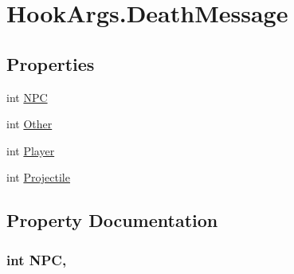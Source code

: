 \hypertarget{structOTA_1_1Plugin_1_1HookArgs_1_1DeathMessage}{}\section{Hook\+Args.\+Death\+Message}
\label{structOTA_1_1Plugin_1_1HookArgs_1_1DeathMessage}
\subsection*{Properties}
\begin{DoxyCompactItemize}
\item 
int \hyperlink{structOTA_1_1Plugin_1_1HookArgs_1_1DeathMessage_aea2a2e9f598c38e622661bbf874275cd}{N\+P\+C}
\item 
int \hyperlink{structOTA_1_1Plugin_1_1HookArgs_1_1DeathMessage_ab86a6d759692d3823e3d50399f4f9eaf}{Other}
\item 
int \hyperlink{structOTA_1_1Plugin_1_1HookArgs_1_1DeathMessage_ad8ab65f2594ec4b0f1682de80995c9a1}{Player}
\item 
int \hyperlink{structOTA_1_1Plugin_1_1HookArgs_1_1DeathMessage_a81145d46bbb2d6b2901632788e65d28a}{Projectile}
\end{DoxyCompactItemize}


\subsection{Property Documentation}
\hypertarget{structOTA_1_1Plugin_1_1HookArgs_1_1DeathMessage_aea2a2e9f598c38e622661bbf874275cd}{}
\subsubsection[{N\+P\+C}]{\setlength{\rightskip}{0pt plus 5cm}int N\+P\+C\hspace{0.3cm}{\ttfamily [get]}, {\ttfamily [set]}}\label{structOTA_1_1Plugin_1_1HookArgs_1_1DeathMessage_aea2a2e9f598c38e622661bbf874275cd}
\hypertarget{structOTA_1_1Plugin_1_1HookArgs_1_1DeathMessage_ab86a6d759692d3823e3d50399f4f9eaf}{}
